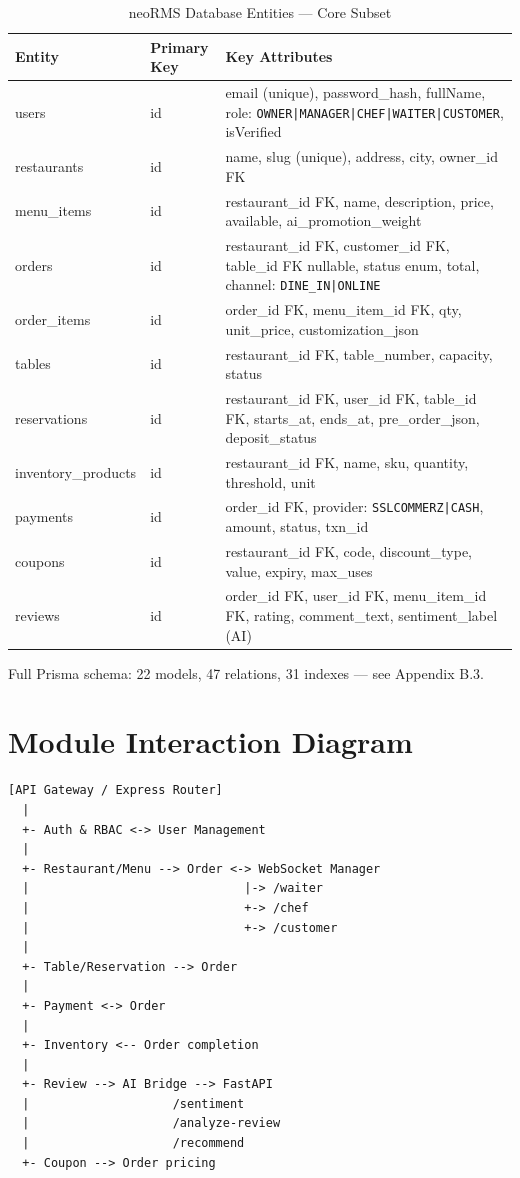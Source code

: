 \begin{table}[H]
\centering
\caption{neoRMS Database Entities --- Core Subset}
\label{tab:db_entities}
\small
\begin{tabularx}{\textwidth}{@{}p{}p{}X@{}}
\toprule
\textbf{Entity} & \textbf{Primary Key} & \textbf{Key Attributes} \\
\midrule
users & id & email (unique), password\_hash, fullName, role: \texttt{OWNER|MANAGER|CHEF|WAITER|CUSTOMER}, isVerified \\
restaurants & id & name, slug (unique), address, city, owner\_id FK \\
menu\_items & id & restaurant\_id FK, name, description, price, available, ai\_promotion\_weight \\
orders & id & restaurant\_id FK, customer\_id FK, table\_id FK nullable, status enum, total, channel: \texttt{DINE\_IN|ONLINE} \\
order\_items & id & order\_id FK, menu\_item\_id FK, qty, unit\_price, customization\_json \\
tables & id & restaurant\_id FK, table\_number, capacity, status \\
reservations & id & restaurant\_id FK, user\_id FK, table\_id FK, starts\_at, ends\_at, pre\_order\_json, deposit\_status \\
inventory\_products & id & restaurant\_id FK, name, sku, quantity, threshold, unit \\
payments & id & order\_id FK, provider: \texttt{SSLCOMMERZ|CASH}, amount, status, txn\_id \\
coupons & id & restaurant\_id FK, code, discount\_type, value, expiry, max\_uses \\
reviews & id & order\_id FK, user\_id FK, menu\_item\_id FK, rating, comment\_text, sentiment\_label (AI) \\
\bottomrule
\end{tabularx}
\end{table}

Full Prisma schema: 22 models, 47 relations, 31 indexes --- see Appendix B.3.

\section{Module Interaction Diagram}
\label{sec:module_interaction}

{\footnotesize
\begin{verbatim}
[API Gateway / Express Router]
  |
  +- Auth & RBAC <-> User Management
  |
  +- Restaurant/Menu --> Order <-> WebSocket Manager
  |                              |-> /waiter
  |                              +-> /chef
  |                              +-> /customer
  |
  +- Table/Reservation --> Order
  |
  +- Payment <-> Order
  |
  +- Inventory <-- Order completion
  |
  +- Review --> AI Bridge --> FastAPI
  |                    /sentiment
  |                    /analyze-review
  |                    /recommend
  +- Coupon --> Order pricing
\end{verbatim}
}

